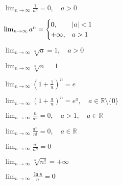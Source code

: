 \begin{minipage}[t]{0.45\textwidth}
\begin{myitemize}
    \item $ \lim_{n\to \infty} \frac{1}{n^{a}} = 0, \quad  a > 0 $ 
    \item $ \lim_{n\to \infty} a^{n} =
        \begin{cases} 
            0, &  \abs{a} < 1 \\
            +\infty, & a>1 
        \end{cases}$
    \item $ \lim_{n\to \infty} \sqrt[n]{a} = 1, \quad  a>0 $
    \item $ \lim_{n\to \infty} \sqrt[n]{n} = 1 $
    \item $ \lim_{n\to \infty} \left(1 + \frac{1}{n}\right)^{n} = e $
    \item $ \lim_{n\to \infty} \left(1 + \frac{a}{n}\right)^{n} = e^{a}, 
        \quad a \in \mathbb{R} \setminus \{0\} $
    \item $ \lim_{n\to \infty} \frac{n}{a^{n}} = 0, \quad  a>1, \quad a \in \mathbb{R} $
    \item $ \lim_{n\to \infty} \frac{a^{n}}{n!} = 0, \quad  a \in \mathbb{R} $
    \item $ \lim_{n\to \infty} \frac{n!}{n^{n}} = 0 $
    \item $ \lim_{n\to \infty} \sqrt[n]{n!} = + \infty $
    \item $ \lim_{n\to \infty} \frac{\ln n}{n} = 0 $
\end{myitemize}
\end{minipage}



